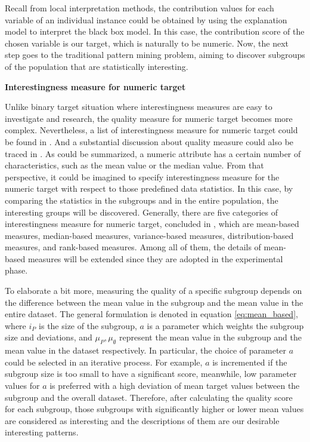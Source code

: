 Recall from local interpretation methods, the contribution values for each variable of an individual instance could be obtained by using the explanation model to interpret the black box model. In this case, the contribution score of the chosen variable is our target, which is naturally to be numeric. Now, the next step goes to the traditional pattern mining problem, aiming to discover subgroups of the population that are statistically interesting. 

\textbf{Interestingness measure for numeric target}

Unlike binary target situation where interestingness measures are easy to investigate and research, the quality measure for numeric target becomes more complex. Nevertheless, a list of interestingness measure for numeric target could be found in \cite{klosgen2002data}. And a substantial discussion about quality measure could also be traced in \cite{pieters2010subgroup}. As could be summarized, a numeric attribute has a certain number of characteristics, such as the mean value or the median value. From that perspective, it could be imagined to specify interestingness measure for the numeric target with respect to those predefined data statistics. In this case, by comparing the statistics in the subgroups and in the entire population, the interesting groups will be discovered. Generally, there are five categories of interestingness measure for numeric target, concluded in \cite{lemmerich2014novel}, which are mean-based measures, median-based measures, variance-based measures, distribution-based measures, and rank-based measures. Among all of them, the details of mean-based measures will be extended since they are adopted in the experimental phase. 

To elaborate a bit more, measuring the quality of a specific subgroup depends on the difference between the mean value in the subgroup and the mean value in the entire dataset. The general formulation is denoted in equation \ref{eq:mean_based}, where $i_{P}$ is the size of the subgroup, $a$ is a parameter which weights the subgroup size and deviations, and $\mu_{P}, \mu_{\emptyset}$ represent the mean value in the subgroup and the mean value in the dataset respectively. In particular, the choice of parameter $a$ could be selected in an iterative process. For example, $a$ is incremented if the subgroup size is too small to have a significant score, meanwhile, low parameter values for $a$ is preferred with a high deviation of mean target values between the subgroup and the overall dataset. Therefore, after calculating the quality score for each subgroup, those subgroups with significantly higher or lower mean values are considered as interesting and the descriptions of them are our desirable interesting patterns. 

